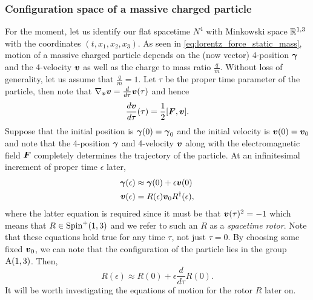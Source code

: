 \documentclass[conf]{new-aiaa}
\begin{document}
\subsubsection{Configuration space of a massive charged particle}

For the moment, let us identify our flat spacetime $N^4$ with Minkowski space $\mathbb{R}^{1,3}$ with the coordinates $(t,x_1,x_2,x_3)$. As seen in \cref{eq:lorentz_force_static_mass}, motion of a massive charged particle depends on the (now vector) 4-position $\boldsymbol{\gamma}$ and the 4-velocity $\boldsymbol{v}$ as well as the charge to mass ratio $\frac{q}{m}$. Without loss of generality, let us assume that $\frac{q}{m}=1$. Let $\tau$ be the proper time parameter of the particle, then note that $\nabla_{\boldsymbol{v}}\boldsymbol{v}=\frac{d}{d\tau} \boldsymbol{v}(\tau)$ and hence
\begin{equation}
    \label{eq:faraday_transport}
    \frac{d\boldsymbol{v}}{d\tau} (\tau) = \frac{1}{2} [\boldsymbol{F},\boldsymbol{v}].
\end{equation}
Suppose that the initial position is $\boldsymbol{\gamma}(0)=\boldsymbol{\gamma}_0$ and the initial velocity is $\boldsymbol{v}(0)=\boldsymbol{v}_0$ and note that the 4-position $\boldsymbol{\gamma}$ and 4-velocity  $\boldsymbol{v}$ along with the electromagnetic field $\boldsymbol{F}$ completely determines the trajectory of the particle. At an infinitesimal increment of proper time $\epsilon$ later,
\begin{align}
\label{eq:linearization_position}
\boldsymbol{\gamma}(\epsilon) &\approx \boldsymbol{\gamma}(0)+\epsilon\boldsymbol{v}(0)\\
\boldsymbol{v}(\epsilon) &=  R(\epsilon)\boldsymbol{v}_0 R^\dagger(\epsilon),
\end{align}
where the latter equation is required since it must be that $\boldsymbol{v}(\tau)^2=-1$ which means that $R\in \operatorname{Spin}^+(1,3)$ and we refer to such an $R$ as a \emph{spacetime rotor}. Note that these equations hold true for any time $\tau$, not just $\tau = 0$. By choosing some fixed $\boldsymbol{v}_0$, we can note that the configuration of the particle lies in the group $\operatorname{A}(1,3)$. Then, 
\begin{equation}
\label{eq:linearization_rotor}
R(\epsilon) \approx R(0)+\epsilon\frac{d}{d\tau}R(0).
\end{equation}
It will be worth investigating the equations of motion for the rotor $R$ later on.


\end{document}
